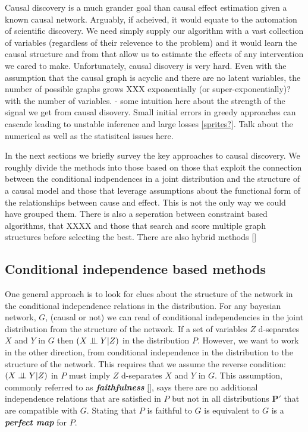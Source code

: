 \documentclass[11pt,a4paper,oneside]{book}
\begin{document}
Causal discovery is a much grander goal than causal effect estimation given a known causal network. Arguably, if acheived, it would equate to the automation of scientific discovery. We need simply supply our algorithm with a vast collection of variables (regardless of their relevence to the problem) and it would learn the causal structure and from that allow us to estimate the effects of any intervention we cared to make. Unfortunately, causal disovery is very hard. Even with the assumption that the causal graph is acyclic and there are no latent variables, the number of possible graphs grows XXX exponentially (or super-exponentially)? with the number of variables. - some intuition here about the strength of the signal we get from causal disovery. Small initial errors in greedy approaches can cascade leading to unstable inference and large losses \ref{sprites?}. Talk about the numerical as well as the statisitcal issues here. 

In the next sections we briefly survey the key approaches to causal discovery. We roughly divide the methods into those based on those that exploit the connection between the conditional indpendences in a joint distribution and the structure of a causal model and those that leverage assumptions about the functional form of the relationships between cause and effect. This is not the only way we could have grouped them. There is also a seperation between constraint based algorithms, that XXXX and those that search and score multiple graph structures before selecting the best. There are also hybrid methods \ref{}  

\subsection*{Conditional independence based methods}
One general approach is to look for clues about the structure of the network in the conditional independence relations in the distribution. For any bayesian network, $G$, (causal or not) we can read of conditional independencies in the joint distribution from the structure of the network. If a set of variables $Z$ d-separates $X$ and $Y$ in $G$ then $(X \perp\!\!\!\perp Y|Z)$ in the distribution $P$. However, we want to work in the other direction, from conditional independence in the distribution to the structure of the network. This requires that we assume the reverse condition: $(X \perp\!\!\!\perp Y|Z)$ in $P$ must imply $Z$ d-separates $X$ and $Y$ in $G$. This assumption, commonly referred to as  \textbf{\textit{faithfulness}} \ref{}, says there are no additional independence relations that are satisfied in $P$ but not in all distributions $\boldsymbol{P'}$ that are compatible with $G$. Stating that $P$ is faithful to $G$ is equivalent to $G$ is a \textbf{\textit{perfect map}} \cite{Kollner} for $P$.
\end{document}
